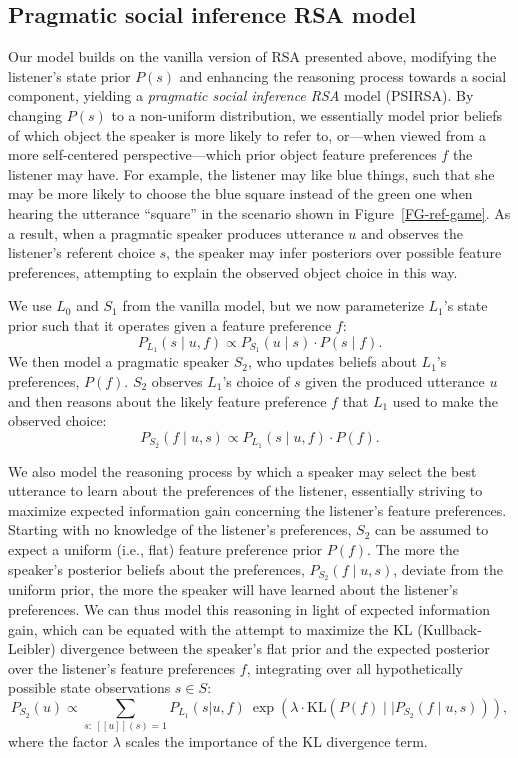 \documentclass[10pt,a4paper]{article}
\newcommand{\gcs}[1]{\textcolor{blue}{[gcs: #1]}}
\begin{document}
\subsection*{Pragmatic social inference RSA model}

Our model builds on the vanilla version of RSA presented above, modifying the listener's state prior $P(s)$ and enhancing the reasoning process towards a social component, yielding a \emph{pragmatic social inference RSA} model (PSIRSA). %
By changing $P(s)$ to a non-uniform distribution, we essentially model prior beliefs of which object the speaker is more likely to refer to, or---when viewed from a more self-centered perspective---which prior object feature preferences $f$ the listener may have. 
For example, the listener may like blue things, such that she may be more likely to choose the blue square instead of the green one when hearing the utterance ``square'' in the scenario shown in Figure~\ref{FG-ref-game}.
As a result, when a pragmatic speaker produces utterance $u$ and observes the listener's referent choice $s$, the speaker may infer posteriors over possible feature preferences, attempting to explain the observed object choice in this way.

We use $L_0$ and $S_1$ from the vanilla model, but we now parameterize $L_1$'s state prior such that it operates given a feature preference $f$:
$$P_{L_{1}}(s\mid u,f) \propto P_{S_{1}}(u \mid s) \cdot P(s \mid f).$$
We then model a pragmatic speaker $S_2$, who updates beliefs about $L_1$'s preferences, $P(f)$.
$S_2$ observes $L_1$'s choice of $s$ given the produced utterance $u$ and then reasons about the likely feature preference $f$ that $L_1$ used to make the observed choice:
$$P_{S_{2}}(f\mid u,s) \propto P_{L_{1}}(s \mid u,f) \cdot P(f).$$

We also model the reasoning process by which a speaker may select the best utterance to learn about the preferences of the listener, essentially striving to maximize expected information gain concerning the listener's feature preferences.
Starting with no knowledge of the listener's preferences, $S_2$ can be assumed to expect a uniform (i.e., flat) feature preference prior $P(f)$.
The more the speaker's posterior beliefs about the preferences, $P_{S_{2}}(f\mid u,s)$, deviate from the uniform prior, the more the speaker will have learned about the listener's preferences. 
We can thus model this reasoning in light of expected information gain, which can be equated with the attempt to maximize the KL (Kullback-Leibler) divergence between the speaker's flat prior and the expected posterior over the listener's feature preferences $f$, integrating over all hypothetically possible state observations $s \in S$: %
$$P_{S_2}(u) \propto \sum_{s:\  [\![u]\!](s)=1} P_{L_1}(s|u,f)\ \exp(\lambda \cdot \textrm{KL}(P(f)\mid\mid P_{S_{2}}(f\mid u,s))),$$
where the factor $\lambda$ scales the importance of the KL divergence term. 
\end{document}

